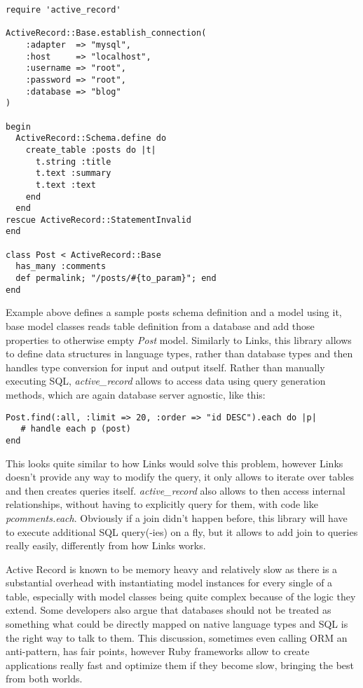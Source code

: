\begin{codelisting}
\begin{verbatim}
require 'active_record'

ActiveRecord::Base.establish_connection(
    :adapter  => "mysql",
    :host     => "localhost",
    :username => "root",
    :password => "root",
    :database => "blog"
)

begin
  ActiveRecord::Schema.define do
    create_table :posts do |t|
      t.string :title
      t.text :summary
      t.text :text
    end
  end
rescue ActiveRecord::StatementInvalid
end

class Post < ActiveRecord::Base
  has_many :comments
  def permalink; "/posts/#{to_param}"; end
end
\end{verbatim}
\end{codelisting}

Example above defines a sample posts schema definition and a model using it, base model classes reads table definition from a database and add those properties to otherwise empty \textit{Post} model. Similarly to Links, this library allows to define data structures in language types, rather than database types and then handles type conversion for input and output itself. Rather than manually executing SQL, \textit{active\_record} allows to access data using query generation methods, which are again database server agnostic, like this:

\begin{codelisting}
\begin{verbatim}
Post.find(:all, :limit => 20, :order => "id DESC").each do |p|
   # handle each p (post)
end
\end{verbatim}
\end{codelisting}

This looks quite similar to how Links would solve this problem, however Links doesn't provide any way to modify the query, it only allows to iterate over tables and then creates queries itself. \textit{active\_record} also allows to then access internal relationships, without having to explicitly query for them, with code like \textit{    pcomments.each}. Obviously if a join didn't happen before, this library will have to execute additional SQL query(-ies) on a fly, but it allows to add join to queries really easily, differently from how Links works.

Active Record is known to be memory heavy and relatively slow as there is a substantial overhead with instantiating model instances for every single of a table, especially with model classes being quite complex because of the logic they extend. Some developers also argue that databases should not be treated as something what could be directly mapped on native language types and SQL is the right way to talk to them. This discussion, sometimes even calling ORM an anti-pattern\citep{antiorm}, has fair points, however Ruby frameworks allow to create applications really fast and optimize them if they become slow, bringing the best from both worlds.

